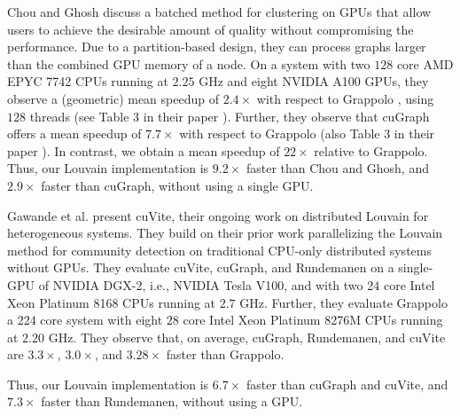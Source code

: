 Chou and Ghosh \cite{chou2022batched} discuss a batched method for clustering on GPUs that allow users to achieve the desirable amount of quality without compromising the performance. Due to a partition-based design, they can process graphs larger than the combined GPU memory of a node. On a system with two $128$ core AMD EPYC 7742 CPUs running at $2.25$ GHz and eight NVIDIA A100 GPUs, they observe a (geometric) mean speedup of $2.4\times$ with respect to Grappolo \cite{com-halappanavar17}, using $128$ threads (see Table 3 in their paper \cite{chou2022batched}). Further, they observe that cuGraph \cite{hricik2020using} offers a mean speedup of $7.7\times$ with respect to Grappolo (also Table 3 in their paper \cite{chou2022batched}). In contrast, we obtain a mean speedup of $22\times$ relative to Grappolo. Thus, our Louvain implementation is $9.2\times$ faster than Chou and Ghosh, and $2.9\times$ faster than cuGraph, without using a single GPU.

Gawande et al. \cite{com-gawande22} present cuVite, their ongoing work on distributed Louvain for heterogeneous systems. They build on their prior work parallelizing the Louvain method for community detection on traditional CPU-only distributed systems without GPUs. They evaluate cuVite, cuGraph, and Rundemanen on a single-GPU of NVIDIA DGX-2, i.e., NVIDIA Tesla V100, and with two $24$ core Intel Xeon Platinum 8168 CPUs running at $2.7$ GHz. Further, they evaluate Grappolo a 224 core system with eight $28$ core Intel Xeon Platinum 8276M CPUs running at $2.20$ GHz. They observe that, on average, cuGraph, Rundemanen, and cuVite are $3.3\times$, $3.0\times$, and $3.28\times$ faster than Grappolo. Thus, our Louvain implementation is $6.7\times$ faster than cuGraph and cuVite, and $7.3\times$ faster than Rundemanen, without using a GPU.
